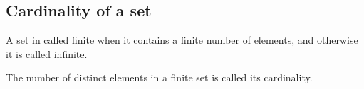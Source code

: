 

\subsection{Cardinality of a set}
A set in called finite when it contains a finite number of elements, and 
otherwise it is called infinite.

The number of distinct elements in a finite set is called its cardinality.


